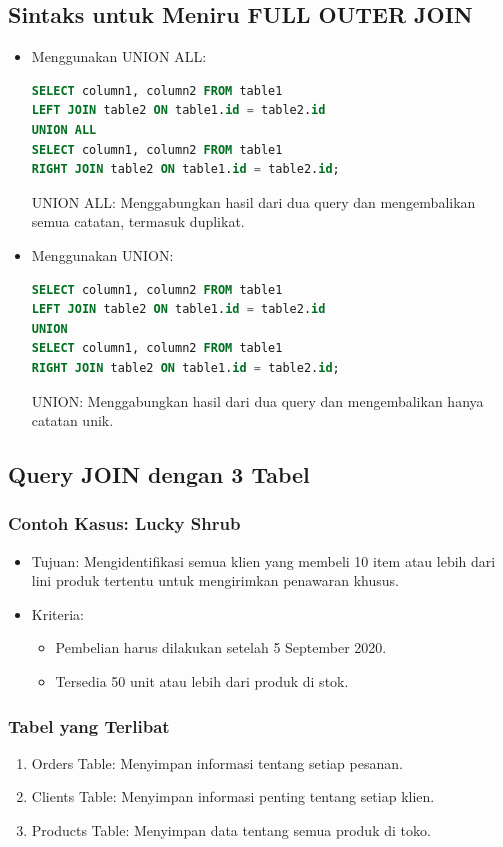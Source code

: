 \documentclass{article}
\begin{document}
\subsection{Sintaks untuk Meniru FULL OUTER JOIN}
\begin{itemize}
    \item Menggunakan UNION ALL:
          \begin{lstlisting}[language=SQL, caption={}, captionpos=b]
SELECT column1, column2 FROM table1
LEFT JOIN table2 ON table1.id = table2.id
UNION ALL
SELECT column1, column2 FROM table1
RIGHT JOIN table2 ON table1.id = table2.id;
\end{lstlisting}

          UNION ALL: Menggabungkan hasil dari dua query dan mengembalikan semua catatan, termasuk duplikat.
    \item Menggunakan UNION:
          \begin{lstlisting}[language=SQL, caption={}, captionpos=b]
SELECT column1, column2 FROM table1
LEFT JOIN table2 ON table1.id = table2.id
UNION
SELECT column1, column2 FROM table1
RIGHT JOIN table2 ON table1.id = table2.id;
\end{lstlisting}

          UNION: Menggabungkan hasil dari dua query dan mengembalikan hanya catatan unik.
\end{itemize}

\subsection{Query JOIN dengan 3 Tabel}
\subsubsection{Contoh Kasus: Lucky Shrub}
\begin{itemize}
    \item Tujuan: Mengidentifikasi semua klien yang membeli 10 item atau lebih dari lini produk tertentu untuk mengirimkan penawaran khusus.
    \item Kriteria:
          \begin{itemize}
              \item Pembelian harus dilakukan setelah 5 September 2020.
              \item Tersedia 50 unit atau lebih dari produk di stok.
          \end{itemize}
\end{itemize}

\subsubsection{Tabel yang Terlibat}
\begin{enumerate}
    \item Orders Table: Menyimpan informasi tentang setiap pesanan.
    \item Clients Table: Menyimpan informasi penting tentang setiap klien.
    \item Products Table: Menyimpan data tentang semua produk di toko.
\end{enumerate}
\end{document}

